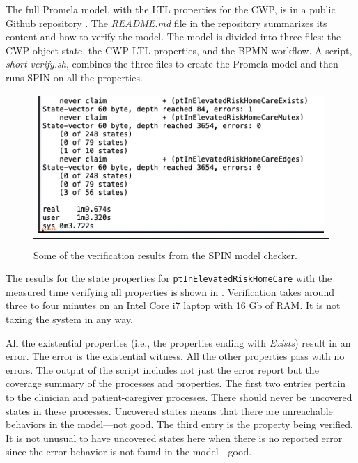 The full Promela model, with the LTL properties for the CWP, is in a public Github repository \cite{repo}. The \emph{README.md} file in the repository summarizes its content and how to verify the model. The model is divided into three files: the CWP object state, the CWP LTL properties, and the BPMN workflow. A script, \emph{short-verify.sh}, combines the three files to create the Promela model and then runs SPIN on all the properties.

\begin{figure}[t]
  \begin{center}
    \begin{tabular}{c}
      \includegraphics[scale=0.50]{proof-digest.png}
    \end{tabular}
  \end{center}
\caption{Some of the verification results from the SPIN model checker.}
\label{fig:proof}
\end{figure}

The results for the state properties for \texttt{ptInElevatedRiskHomeCare} with the measured time verifying all properties is shown in . Verification takes around three to four minutes on an Intel Core i7 laptop with 16 Gb of RAM. It is not taxing the system in any way. 

All the existential properties (i.e., the properties ending with \emph{Exists}) result in an error. The error is the existential witness. All the other properties pass with no errors. The output of the script includes not just the error report but the coverage summary of the processes and properties. The first two entries pertain to the clinician and patient-caregiver processes. There should never be uncovered states in these processes. Uncovered states means that there are unreachable behaviors in the model---not good. The third entry is the property being verified. It is not unusual to have uncovered states here when there is no reported error since the error behavior is not found in the model---good.